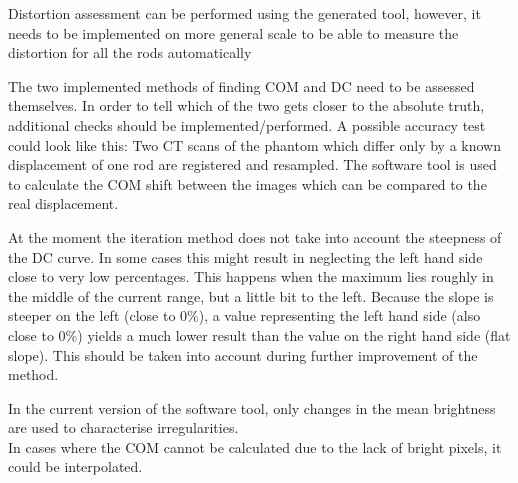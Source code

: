 Distortion assessment can be performed using the generated tool, however, it needs to be implemented on more general scale to be able to measure the distortion for all the rods automatically

The two implemented methods of finding COM and DC need to be assessed themselves.
In order to tell which of the two gets closer to the absolute truth, additional checks should be implemented/performed.
A possible accuracy test could look like this:
Two CT scans of the phantom which differ only by a known displacement of one rod are registered and resampled.
The software tool is used to calculate the COM shift between the images which can be compared to the real displacement.

At the moment the iteration method does not take into account the steepness of the DC curve.
In some cases this might result in neglecting the left hand side close to very low percentages.
This happens when the maximum lies roughly in the middle of the current range, but a little bit to the left.
Because the slope is steeper on the left (close to 0\%), a value representing the left hand side (also close to 0\%) yields a much lower result than the value on the right hand side (flat slope).
This should be taken into account during further improvement of the method.

In the current version of the software tool, only changes in the mean brightness are used to characterise irregularities.\\

In cases where the COM cannot be calculated due to the lack of bright pixels, it could be interpolated.

